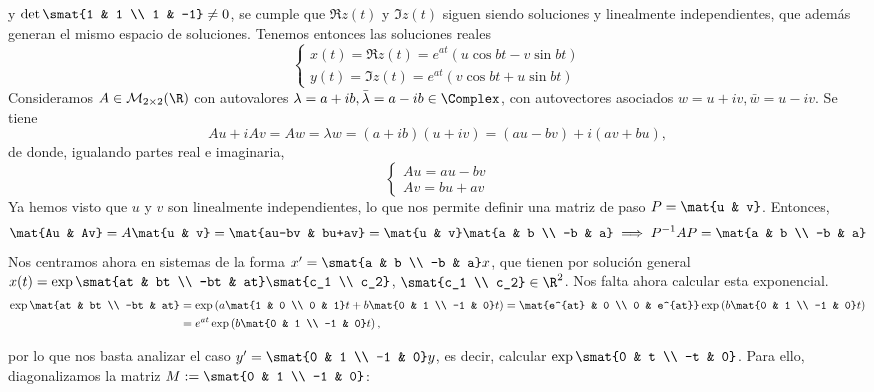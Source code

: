 \documentclass[../main.tex]{subfiles}
\begin{document}
  y \(\det\smat{1 & 1 \\ 1 & -1} \neq 0\), se cumple que \(\Re z(t)\) y
  \(\Im z(t)\) siguen siendo soluciones y linealmente independientes, que además
  generan el mismo espacio de soluciones. Tenemos entonces las soluciones reales
  \[
    \begin{cases}
      x(t) = \Re z(t) = e^{at}(u\cos bt - v\sin bt) \\
      y(t) = \Im z(t) = e^{at}(v\cos bt + u\sin bt)
    \end{cases}
  \]
  Consideramos \(A \in \mathcal{M}_{2 \times 2}(\R)\) con autovalores
  \(\lambda = a+ib, \bar{\lambda} = a-ib \in \Complex\), con autovectores
  asociados \(w = u+iv, \bar{w} = u-iv\). Se tiene
  \[Au + iAv = Aw = \lambda w = (a+ib)(u+iv) = (au-bv) + i(av+bu),\]
  de donde, igualando partes real e imaginaria,
  \[
  \begin{cases}
    Au = au-bv \\
    Av = bu+av
  \end{cases}
  \]
  Ya hemos visto que \(u\) y \(v\) son linealmente independientes, lo que nos
  permite definir una matriz de paso \(P = \mat{u & v}\). Entonces,
  \[\mat{Au & Av} = A \mat{u & v} = \mat{au-bv & bu+av} = \mat{u & v} \mat{a & b
      \\ -b & a} \implies P^{-1}AP = \mat{a & b \\ -b & a}\]
  Nos centramos ahora en sistemas de la forma \(x' = \smat{a & b \\ -b & a}x\),
  que tienen por solución general \(x(t) = \exp \smat{at & bt \\ -bt & at}
  \smat{c_1 \\ c_2}\), \(\smat{c_1 \\ c_2} \in \R^2\). Nos falta ahora calcular
  esta exponencial.
  \begin{align*}
    \exp\mat{at & bt \\ -bt & at} &= \exp\left(a\mat{1 & 0 \\ 0 & 1}t + b\mat{0 & 1 \\
    -1 & 0}t\right) = \mat{e^{at} & 0 \\ 0 & e^{at}} \exp\left(b\mat{0 & 1
    \\ -1 & 0}t\right) \\
    &= e^{at}\exp\left(b\mat{0 & 1 \\ -1 & 0}t\right),
  \end{align*}

  por lo que nos basta analizar el caso \(y' = \smat{0 & 1 \\ -1 & 0}y\), es
  decir, calcular \(\exp \smat{0 & t \\ -t & 0}\). Para ello, diagonalizamos la
  matriz \(M := \smat{0 & 1 \\ -1 & 0}\):
\end{document}
